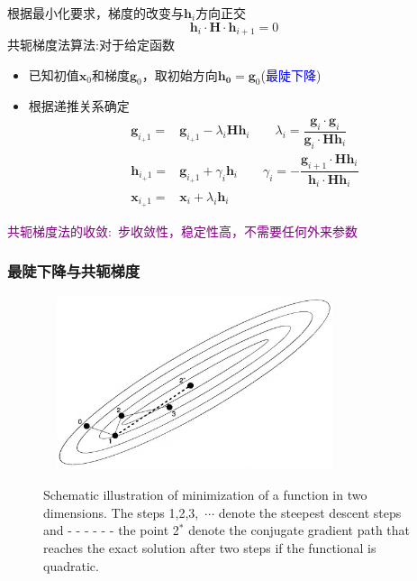{{	根据最小化要求，梯度的改变与$\mathbf{h}_i$方向正交
	\begin{displaymath}
		\mathbf{h}_i\cdot\mathbf{H}\cdot\mathbf{h}_{i+1}=0
	\end{displaymath}
	共轭梯度法算法:对于给定函数
	\begin{itemize}
		\item 已知初值$\mathbf{x}_0$和梯度$\mathbf{g}_0$，取初始方向$\mathbf{h_0}=\mathbf{g}_0$(\textcolor{blue}{最陡下降})
		\item 根据递推关系确定
			\begin{displaymath}
				\begin{aligned}
					\mathbf{g}_{i_+1}=&\mathbf{g}_{i_+1}-\lambda_i\mathbf{H}\mathbf{h}_{i}\qquad \lambda_i=\dfrac{\mathbf{g}_i\cdot\mathbf{g}_i}{\mathbf{g}_i\cdot\mathbf{H}\mathbf{h}_i}\\	
					\mathbf{h}_{i_+1}=&\mathbf{g}_{i_+1}+\gamma_i\mathbf{h}_{i}\qquad \gamma_i=-\dfrac{\mathbf{g}_{i+1}\cdot\mathbf{H}\mathbf{h}_i}{\mathbf{h}_i\cdot\mathbf{H}\mathbf{h}_i}\\	
					\mathbf{x}_{i_+1}=&\mathbf{x}_{i}+\lambda_i\mathbf{h}_{i}
				\end{aligned}
			\end{displaymath}
	\end{itemize}
	\textcolor{purple}{共轭梯度法的收敛:~步收敛性，稳定性高，不需要任何外来参数}
}

\frame
{
	\frametitle{最陡下降与共轭梯度}
\begin{figure}[h!]
\centering
\includegraphics[height=2.0in,width=3.5in,viewport=0 0 950 590,clip]{Figures/OP_descent_CG.png}
\label{decent_CG}
\caption{\tiny \textrm{Schematic illustration of minimization of a function in two dimensions. The steps 1,2,3,~$\cdots$ denote the steepest descent steps and - \!- \!- \!- \!- \!- the point 2$^{\ast}$ denote the conjugate gradient path that reaches the exact solution after two steps if the functional is quadratic.}}%
\end{figure}
}

}
